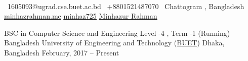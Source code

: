 \documentclass[]{awesome-cv}
\begin{document}
    
\begin{center}
	  \\
	\vspace{2mm}
	{\faEnvelope\ 1605093@ugrad.cse.buet.ac.bd} \hspace{5mm} {\faMobile\ +8801521487070}  \hspace{5mm} {\faMapMarker\ Chattogram , Bangladesh} \hspace{5mm} {\faLink\href{https://minhazrahman.me}{\underline{minhazrahman.me}}}  {\faGithub \href{https://github.com/minhaz725}{\underline{minhaz725}}} \hspace{5mm} {\faLinkedin \href{https://www.linkedin.com/in/minhaz725/}{\underline{Minhazur Rahman}}}
\end{center}
\begin{cventries}
	\cventry
	{BSC in Computer Science and Engineering \newline Level -4 , Term -1 (Running)}
	{Bangladesh University of Engineering and Technology (\href{https://www.buet.ac.bd/}{\underline{BUET}})}
	{Dhaka, Bangladesh}
	{February, 2017 – Present}
	{}
\end{cventries}

\vspace{-4mm}
\end{document}
